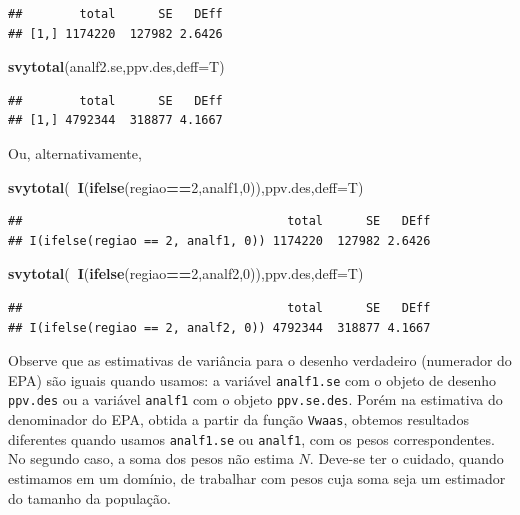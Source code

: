 \documentclass[]{book}
\newenvironment{Shaded}{\begin{snugshade}}{\end{snugshade}}
\newcommand{\KeywordTok}[1]{\textcolor[rgb]{0.13,0.29,0.53}{\textbf{#1}}}
\newcommand{\DataTypeTok}[1]{\textcolor[rgb]{0.13,0.29,0.53}{#1}}
\newcommand{\DecValTok}[1]{\textcolor[rgb]{0.00,0.00,0.81}{#1}}
\newcommand{\OperatorTok}[1]{\textcolor[rgb]{0.81,0.36,0.00}{\textbf{#1}}}
\newcommand{\NormalTok}[1]{#1}
\theoremstyle{definition}
\theoremstyle{definition}
\theoremstyle{definition}
\theoremstyle{remark}
\begin{document}
\begin{verbatim}
##        total      SE   DEff
## [1,] 1174220  127982 2.6426
\end{verbatim}

\begin{Shaded}
\begin{Highlighting}[]
\KeywordTok{svytotal}\NormalTok{(analf2.se,ppv.des,}\DataTypeTok{deff=}\NormalTok{T)}
\end{Highlighting}
\end{Shaded}

\begin{verbatim}
##        total      SE   DEff
## [1,] 4792344  318877 4.1667
\end{verbatim}

Ou, alternativamente,

\begin{Shaded}
\begin{Highlighting}[]
\KeywordTok{svytotal}\NormalTok{(}\OperatorTok{~}\KeywordTok{I}\NormalTok{(}\KeywordTok{ifelse}\NormalTok{(regiao}\OperatorTok{==}\DecValTok{2}\NormalTok{,analf1,}\DecValTok{0}\NormalTok{)),ppv.des,}\DataTypeTok{deff=}\NormalTok{T)}
\end{Highlighting}
\end{Shaded}

\begin{verbatim}
##                                     total      SE   DEff
## I(ifelse(regiao == 2, analf1, 0)) 1174220  127982 2.6426
\end{verbatim}

\begin{Shaded}
\begin{Highlighting}[]
\KeywordTok{svytotal}\NormalTok{(}\OperatorTok{~}\KeywordTok{I}\NormalTok{(}\KeywordTok{ifelse}\NormalTok{(regiao}\OperatorTok{==}\DecValTok{2}\NormalTok{,analf2,}\DecValTok{0}\NormalTok{)),ppv.des,}\DataTypeTok{deff=}\NormalTok{T)}
\end{Highlighting}
\end{Shaded}

\begin{verbatim}
##                                     total      SE   DEff
## I(ifelse(regiao == 2, analf2, 0)) 4792344  318877 4.1667
\end{verbatim}

Observe que as estimativas de variância para o desenho verdadeiro
(numerador do EPA) são iguais quando usamos: a variável
\texttt{analf1.se} com o objeto de desenho \texttt{ppv.des} ou a
variável \texttt{analf1} com o objeto \texttt{ppv.se.des}. Porém na
estimativa do denominador do EPA, obtida a partir da função
\texttt{Vwaas}, obtemos resultados diferentes quando usamos
\texttt{analf1.se} ou \texttt{analf1}, com os pesos correspondentes. No
segundo caso, a soma dos pesos não estima \(N\). Deve-se ter o cuidado,
quando estimamos em um domínio, de trabalhar com pesos cuja soma seja um
estimador do tamanho da população.
\end{document}
